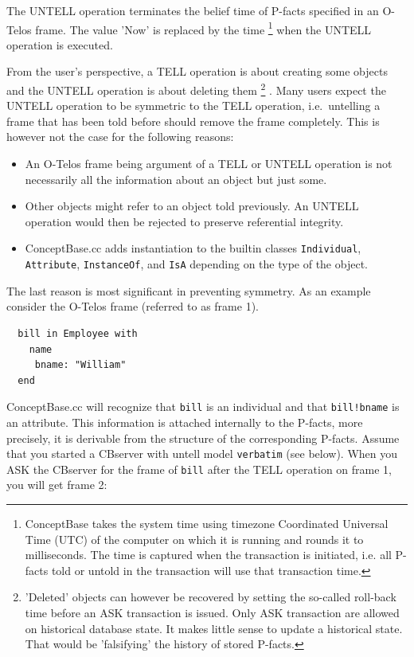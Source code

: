 The UNTELL operation terminates the belief time of P-facts specified in an O-Telos
frame. The value
'Now' is replaced by the time%
\footnote{ConceptBase takes the system time using timezone Coordinated Universal Time (UTC) of the computer on
which it is running and rounds it to milliseconds. The time is captured when the transaction is initiated,
i.e. all P-facts told or untold in the transaction will use that transaction time.
}
when the UNTELL operation is executed. 

From the user's  perspective, a TELL operation is about creating some objects and
the UNTELL operation is about deleting them%
\footnote{ 'Deleted' objects can however be recovered
by setting the so-called roll-back time before an ASK transaction is issued.
Only ASK transaction are allowed on historical database state. It makes little
sense to update a historical state. That would be 'falsifying' the history of stored P-facts.}%
. Many users expect the UNTELL operation to be symmetric to the TELL operation,
i.e.\ untelling a frame that has been told before should remove the frame completely. 
This is however not the case for the following reasons:

\begin{itemize}
\item An O-Telos frame being argument of a TELL or UNTELL operation is not necessarily all
the information about an object but just some. 
\item Other objects might refer to an object told previously. An UNTELL operation would then
be rejected to preserve referential integrity.
\item ConceptBase.cc adds instantiation to the builtin classes {\tt Individual},
{\tt Attribute}, {\tt Instance\-Of}, and {\tt IsA} depending on the type of the object.
\end{itemize}

The last reason is most significant in preventing symmetry. As an example consider the O-Telos 
frame (referred to as frame 1).

\begin{verbatim}
  bill in Employee with
    name
     bname: "William"
  end
\end{verbatim}

ConceptBase.cc will recognize that {\tt bill} is an individual and that {\tt bill!bname} is an
attribute. This information is attached internally to the P-facts, more precisely, it is derivable
from the structure of the corresponding P-facts.
Assume that you started a CBserver with untell model {\tt verbatim} (see below).
When you ASK the CBserver for the frame of {\tt bill}
after the TELL operation on frame 1, you will get frame 2:

